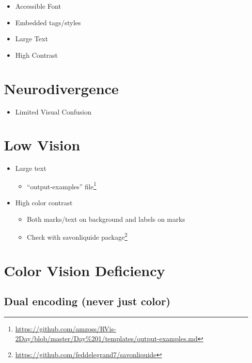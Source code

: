 \documentclass[
]{krantz}
\providecommand{\tightlist}{%
  \setlength{\itemsep}{0pt}\setlength{\parskip}{0pt}}
\renewcommand{\href}[2]{#2\footnote{\url{#1}}}
\begin{document}
\begin{itemize}
\tightlist
\item
  Accessible Font
\item
  Embedded tags/styles
\item
  Large Text
\item
  High Contrast
\end{itemize}

\hypertarget{neurodivergence}{%
\section{Neurodivergence}\label{neurodivergence}}

\begin{itemize}
\tightlist
\item
  Limited Visual Confusion
\end{itemize}

\hypertarget{low-vision}{%
\section{Low Vision}\label{low-vision}}

\begin{itemize}
\item
  Large text

  \begin{itemize}
  \tightlist
  \item
    \href{https://github.com/amzoss/RVis-2Day/blob/master/Day\%201/templates/output-examples.md}{``output-examples'' file}
  \end{itemize}
\item
  High color contrast

  \begin{itemize}
  \item
    Both marks/text on background and labels on marks
  \item
    Check with \href{https://github.com/feddelegrand7/savonliquide}{savonliquide package}
  \end{itemize}
\end{itemize}

\hypertarget{color-vision-deficiency}{%
\section{Color Vision Deficiency}\label{color-vision-deficiency}}

\hypertarget{dual-encoding-never-just-color}{%
\subsection{Dual encoding (never just color)}\label{dual-encoding-never-just-color}}
\end{document}
